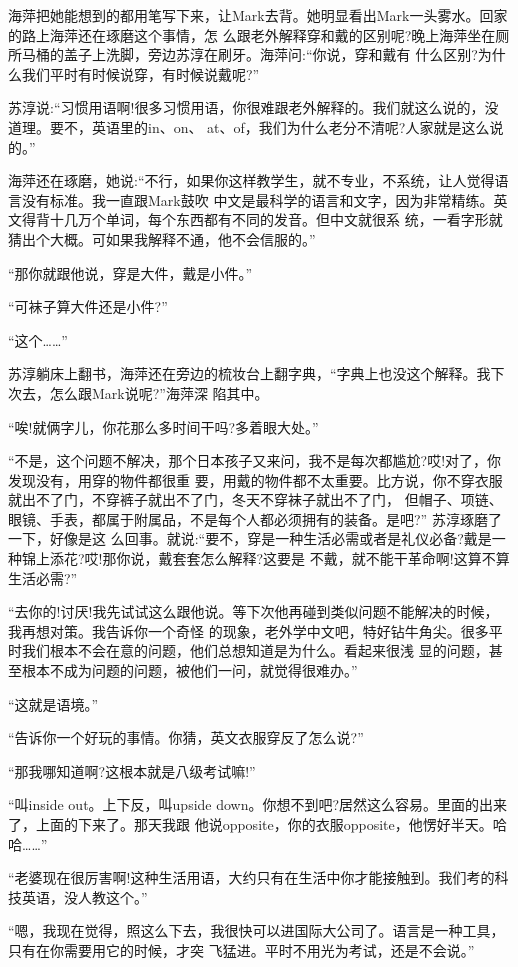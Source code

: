 \documentclass[11pt,a4paper,onecolumn]{article}
\begin{document}
海萍把她能想到的都用笔写下来，让Mark去背。她明显看出Mark一头雾水。回家的路上海萍还在琢磨这个事情，怎
么跟老外解释穿和戴的区别呢?晚上海萍坐在厕所马桶的盖子上洗脚，旁边苏淳在刷牙。海萍问:``你说，穿和戴有
什么区别?为什么我们平时有时候说穿，有时候说戴呢?''

苏淳说:``习惯用语啊!很多习惯用语，你很难跟老外解释的。我们就这么说的，没道理。要不，英语里的in、on、
at、of，我们为什么老分不清呢?人家就是这么说的。''

海萍还在琢磨，她说:``不行，如果你这样教学生，就不专业，不系统，让人觉得语言没有标准。我一直跟Mark鼓吹
中文是最科学的语言和文字，因为非常精练。英文得背十几万个单词，每个东西都有不同的发音。但中文就很系
统，一看字形就猜出个大概。可如果我解释不通，他不会信服的。''

``那你就跟他说，穿是大件，戴是小件。''

``可袜子算大件还是小件?''

``这个……''

苏淳躺床上翻书，海萍还在旁边的梳妆台上翻字典，``字典上也没这个解释。我下次去，怎么跟Mark说呢?''海萍深
陷其中。

``唉!就俩字儿，你花那么多时间干吗?多着眼大处。''

``不是，这个问题不解决，那个日本孩子又来问，我不是每次都尴尬?哎!对了，你发现没有，用穿的物件都很重
要，用戴的物件都不太重要。比方说，你不穿衣服就出不了门，不穿裤子就出不了门，冬天不穿袜子就出不了门，
但帽子、项链、眼镜、手表，都属于附属品，不是每个人都必须拥有的装备。是吧?'' 苏淳琢磨了一下，好像是这
么回事。就说:``要不，穿是一种生活必需或者是礼仪必备?戴是一种锦上添花?哎!那你说，戴套套怎么解释?这要是
不戴，就不能干革命啊!这算不算生活必需?''

``去你的!讨厌!我先试试这么跟他说。等下次他再碰到类似问题不能解决的时候，我再想对策。我告诉你一个奇怪
的现象，老外学中文吧，特好钻牛角尖。很多平时我们根本不会在意的问题，他们总想知道是为什么。看起来很浅
显的问题，甚至根本不成为问题的问题，被他们一问，就觉得很难办。''

``这就是语境。''

``告诉你一个好玩的事情。你猜，英文衣服穿反了怎么说?''

``那我哪知道啊?这根本就是八级考试嘛!''

``叫inside out。上下反，叫upside down。你想不到吧?居然这么容易。里面的出来了，上面的下来了。那天我跟
他说opposite，你的衣服opposite，他愣好半天。哈哈……''

``老婆现在很厉害啊!这种生活用语，大约只有在生活中你才能接触到。我们考的科技英语，没人教这个。''

``嗯，我现在觉得，照这么下去，我很快可以进国际大公司了。语言是一种工具，只有在你需要用它的时候，才突
飞猛进。平时不用光为考试，还是不会说。''
\end{document}
